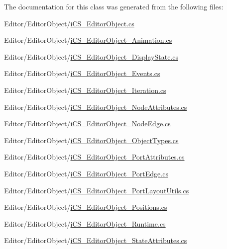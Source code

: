 The documentation for this class was generated from the following files\+:\begin{DoxyCompactItemize}
\item 
Editor/\+Editor\+Object/\hyperlink{i_c_s___editor_object_8cs}{i\+C\+S\+\_\+\+Editor\+Object.\+cs}\item 
Editor/\+Editor\+Object/\hyperlink{i_c_s___editor_object___animation_8cs}{i\+C\+S\+\_\+\+Editor\+Object\+\_\+\+Animation.\+cs}\item 
Editor/\+Editor\+Object/\hyperlink{i_c_s___editor_object___display_state_8cs}{i\+C\+S\+\_\+\+Editor\+Object\+\_\+\+Display\+State.\+cs}\item 
Editor/\+Editor\+Object/\hyperlink{i_c_s___editor_object___events_8cs}{i\+C\+S\+\_\+\+Editor\+Object\+\_\+\+Events.\+cs}\item 
Editor/\+Editor\+Object/\hyperlink{i_c_s___editor_object___iteration_8cs}{i\+C\+S\+\_\+\+Editor\+Object\+\_\+\+Iteration.\+cs}\item 
Editor/\+Editor\+Object/\hyperlink{i_c_s___editor_object___node_attributes_8cs}{i\+C\+S\+\_\+\+Editor\+Object\+\_\+\+Node\+Attributes.\+cs}\item 
Editor/\+Editor\+Object/\hyperlink{i_c_s___editor_object___node_edge_8cs}{i\+C\+S\+\_\+\+Editor\+Object\+\_\+\+Node\+Edge.\+cs}\item 
Editor/\+Editor\+Object/\hyperlink{i_c_s___editor_object___object_types_8cs}{i\+C\+S\+\_\+\+Editor\+Object\+\_\+\+Object\+Types.\+cs}\item 
Editor/\+Editor\+Object/\hyperlink{i_c_s___editor_object___port_attributes_8cs}{i\+C\+S\+\_\+\+Editor\+Object\+\_\+\+Port\+Attributes.\+cs}\item 
Editor/\+Editor\+Object/\hyperlink{i_c_s___editor_object___port_edge_8cs}{i\+C\+S\+\_\+\+Editor\+Object\+\_\+\+Port\+Edge.\+cs}\item 
Editor/\+Editor\+Object/\hyperlink{i_c_s___editor_object___port_layout_utils_8cs}{i\+C\+S\+\_\+\+Editor\+Object\+\_\+\+Port\+Layout\+Utils.\+cs}\item 
Editor/\+Editor\+Object/\hyperlink{i_c_s___editor_object___positions_8cs}{i\+C\+S\+\_\+\+Editor\+Object\+\_\+\+Positions.\+cs}\item 
Editor/\+Editor\+Object/\hyperlink{i_c_s___editor_object___runtime_8cs}{i\+C\+S\+\_\+\+Editor\+Object\+\_\+\+Runtime.\+cs}\item 
Editor/\+Editor\+Object/\hyperlink{i_c_s___editor_object___state_attributes_8cs}{i\+C\+S\+\_\+\+Editor\+Object\+\_\+\+State\+Attributes.\+cs}\item 

\end{DoxyCompactItemize}
